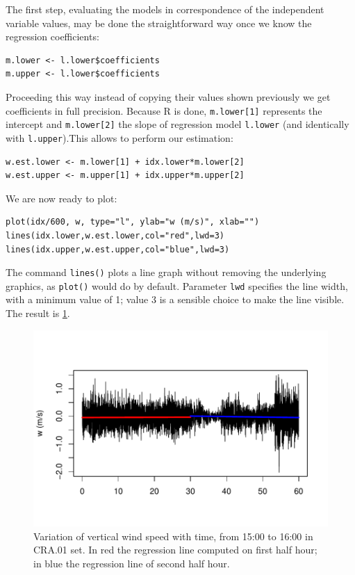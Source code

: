 \documentclass[a4paper,10pt]{book}
\begin{document}
The first step, evaluating the models in correspondence of the independent variable values, may be done the straightforward way once we know the regression coefficients:

\begin{verbatim}
m.lower <- l.lower$coefficients
m.upper <- l.lower$coefficients
\end{verbatim}

Proceeding this way instead of copying their values shown previously we get coefficients in full precision. Because R is done, \verb|m.lower[1]| represents the intercept and \verb|m.lower[2]| the slope of regression model \verb|l.lower| (and identically with \verb|l.upper|).This allows to perform our estimation:

\begin{verbatim}
w.est.lower <- m.lower[1] + idx.lower*m.lower[2]
w.est.upper <- m.upper[1] + idx.upper*m.upper[2]
\end{verbatim}

\noindent We are now ready to plot:

\begin{verbatim}
plot(idx/600, w, type="l", ylab="w (m/s)", xlab="")
lines(idx.lower,w.est.lower,col="red",lwd=3)
lines(idx.upper,w.est.upper,col="blue",lwd=3)
\end{verbatim}

The command \verb|lines()| plots a line graph without removing the underlying graphics, as \verb|plot()| would do by default. Parameter \verb|lwd| specifies the line width, with a minimum value of 1; value 3 is a sensible choice to make the line visible. The result is \ref{fig:Simple plot 4}.

\begin{figure}[htp]
 \centering
 \begin{center}
 \includegraphics[scale=1.1,keepaspectratio=true]{./diagrams/SimplePlot4.pdf}
 \end{center}
 \caption{Variation of vertical wind speed with time, from 15:00 to 16:00 in CRA.01 set. In red the regression line computed on first half hour; in blue the regression line of second half hour.}
 \label{fig:Simple plot 4}
\end{figure}
\end{document}
